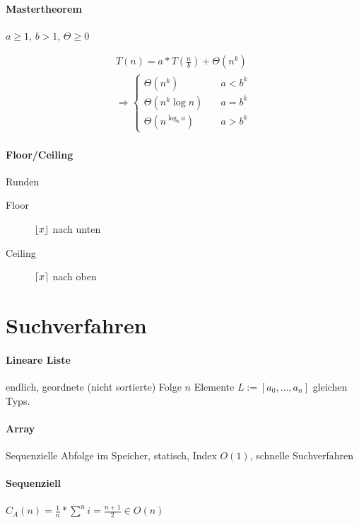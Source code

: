\paragraph{Mastertheorem} $a \geq 1$, $b > 1$, $\Theta \geq 0$


\begin{gather*}
  T(n) = a * T( \frac{n}{b} ) + \Theta (n^k) \\
  \Rightarrow \begin{cases}
    \Theta ( n^k ) \quad          & a < b^k \\
    \Theta ( n^k \log n ) \quad   & a = b^k \\
    \Theta ( n^{\log_b a} ) \quad & a > b^k
  \end{cases}
\end{gather*}

\paragraph{Floor/Ceiling} Runden

\begin{description}
  \item [Floor] $\lfloor x\rfloor$ nach unten

  \item [Ceiling] $\lceil x\rceil$ nach oben
\end{description}

\section{Suchverfahren}

\paragraph{Lineare Liste}
endlich, geordnete (nicht sortierte) Folge $n$ Elemente $L := [a_0, \dots, a_n]$ gleichen Typs.

\paragraph{Array}
Sequenzielle Abfolge im Speicher, statisch, Index $O(1)$, schnelle Suchverfahren 

\paragraph{Sequenziell}
$C_A(n) = \frac{1}{n} * \sum^n i = \frac{n + 1}{2} \in O(n)$\

